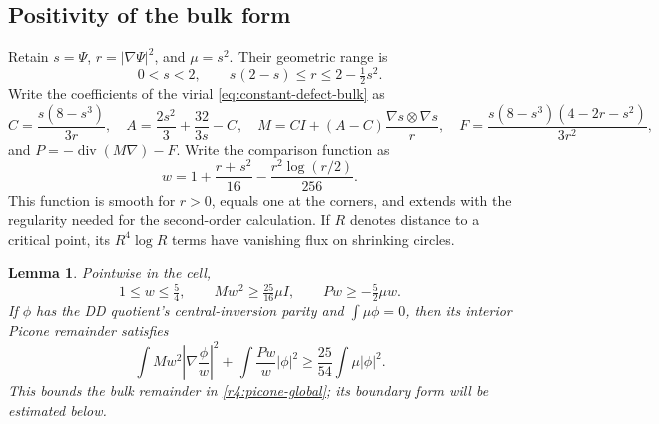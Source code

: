 \documentclass[reqno,11pt]{amsart}
\numberwithin{equation}{section}
\newtheorem{lemma}[theorem]{Lemma}
\theoremstyle{remark}
\begin{document}
\subsection{Positivity of the bulk form}

Retain $s=\Psi$, $r=|\nabla\Psi|^2$, and $\mu=s^2$. Their geometric range is
\[
 0<s<2,\qquad s(2-s)\le r\le2-\tfrac12s^2.
\]
Write the coefficients of the virial \eqref{eq:constant-defect-bulk} as
\[
 C=\frac{s(8-s^3)}{3r},\quad
 A=\frac{2s^2}{3}+\frac{32}{3s}-C,\quad
 M=C I+(A-C)\frac{\nabla s\otimes\nabla s}{r},\quad
 F=\frac{s(8-s^3)(4-2r-s^2)}{3r^2},
\]
and $P=-\operatorname{div}(M\nabla)-F$. Write the comparison function as
\[
 w=1+\frac{r+s^2}{16}-\frac{r^2\log(r/2)}{256}.
\]
This function is smooth for $r>0$, equals one at the corners, and
extends with the regularity needed for the second-order calculation.
If $R$ denotes distance to a critical point, its $R^4\log R$ terms
have vanishing flux on shrinking circles.

\begin{lemma}\label{r4:bulk-picone}
Pointwise in the cell,
\[
 1\le w\le\tfrac54,\qquad Mw^2\ge\tfrac{25}{16}\mu I,
 \qquad Pw\ge-\tfrac52\mu w.
\]
If $\phi$ has the DD quotient's central-inversion parity and
$\int\mu\phi=0$, then its interior Picone remainder satisfies
\[
 \int Mw^2\left|\nabla\frac\phi w\right|^2
 +\int\frac{Pw}{w}|\phi|^2
 \ge\frac{25}{54}\int\mu|\phi|^2.
\]
This bounds the bulk remainder in \eqref{r4:picone-global}; its
boundary form will be estimated below.
\end{lemma}
\end{document}
